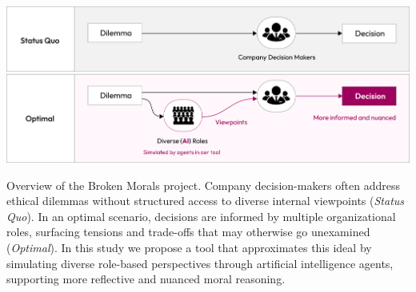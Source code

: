 \documentclass[sigconf, authorversion, nonacm, screen]{acmart}
\begin{document}

\begin{teaserfigure}
  \includegraphics[width=\textwidth]{teaser}
  \caption{Overview of the Broken Morals project. Company decision-makers often address ethical dilemmas without structured access to diverse internal viewpoints (\textit{Status Quo}). In an optimal scenario, decisions are informed by multiple organizational roles, surfacing tensions and trade-offs that may otherwise go unexamined (\textit{Optimal}). In this study we propose a tool that approximates this ideal by simulating diverse role-based perspectives through artificial intelligence agents, supporting more reflective and nuanced moral reasoning.}
  \label{fig:teaser}
\end{teaserfigure}

\maketitle




\end{document}
